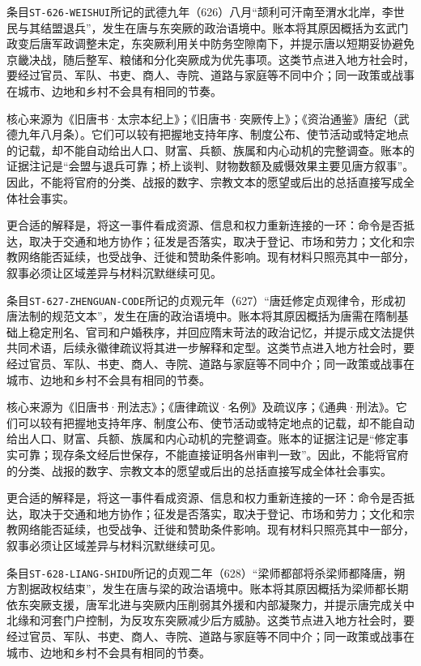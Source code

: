 
条目\texttt{ST-626-WEISHUI}所记的武德九年（626）八月“颉利可汗南至渭水北岸，李世民与其结盟退兵”，发生在唐与东突厥的政治语境中。账本将其原因概括为玄武门政变后唐军政调整未定，东突厥利用关中防务空隙南下，并提示唐以短期妥协避免京畿决战，随后整军、粮储和分化突厥成为优先事项。这类节点进入地方社会时，要经过官员、军队、书吏、商人、寺院、道路与家庭等不同中介；同一政策或战事在城市、边地和乡村不会具有相同的节奏。

核心来源为《旧唐书·太宗本纪上》；《旧唐书·突厥传上》；《资治通鉴》唐纪（武德九年八月条）。它们可以较有把握地支持年序、制度公布、使节活动或特定地点的记载，却不能自动给出人口、财富、兵额、族属和内心动机的完整调查。账本的证据注记是“会盟与退兵可靠；桥上谈判、财物数额及威慑效果主要见唐方叙事”。因此，不能将官府的分类、战报的数字、宗教文本的愿望或后出的总括直接写成全体社会事实。

更合适的解释是，将这一事件看成资源、信息和权力重新连接的一环：命令是否抵达，取决于交通和地方协作；征发是否落实，取决于登记、市场和劳力；文化和宗教网络能否延续，也受战争、迁徙和赞助条件影响。现有材料只照亮其中一部分，叙事必须让区域差异与材料沉默继续可见。


条目\texttt{ST-627-ZHENGUAN-CODE}所记的贞观元年（627）“唐廷修定贞观律令，形成初唐法制的规范文本”，发生在唐的政治语境中。账本将其原因概括为唐需在隋制基础上稳定刑名、官司和户婚秩序，并回应隋末苛法的政治记忆，并提示成文法提供共同术语，后续永徽律疏议将其进一步解释和定型。这类节点进入地方社会时，要经过官员、军队、书吏、商人、寺院、道路与家庭等不同中介；同一政策或战事在城市、边地和乡村不会具有相同的节奏。

核心来源为《旧唐书·刑法志》；《唐律疏议·名例》及疏议序；《通典·刑法》。它们可以较有把握地支持年序、制度公布、使节活动或特定地点的记载，却不能自动给出人口、财富、兵额、族属和内心动机的完整调查。账本的证据注记是“修定事实可靠；现存条文经后世保存，不能直接证明各州审判一致”。因此，不能将官府的分类、战报的数字、宗教文本的愿望或后出的总括直接写成全体社会事实。

更合适的解释是，将这一事件看成资源、信息和权力重新连接的一环：命令是否抵达，取决于交通和地方协作；征发是否落实，取决于登记、市场和劳力；文化和宗教网络能否延续，也受战争、迁徙和赞助条件影响。现有材料只照亮其中一部分，叙事必须让区域差异与材料沉默继续可见。


条目\texttt{ST-628-LIANG-SHIDU}所记的贞观二年（628）“梁师都部将杀梁师都降唐，朔方割据政权结束”，发生在唐与梁的政治语境中。账本将其原因概括为梁师都长期依东突厥支援，唐军北进与突厥内压削弱其外援和内部凝聚力，并提示唐完成关中北缘和河套门户控制，为反攻东突厥减少后方威胁。这类节点进入地方社会时，要经过官员、军队、书吏、商人、寺院、道路与家庭等不同中介；同一政策或战事在城市、边地和乡村不会具有相同的节奏。

